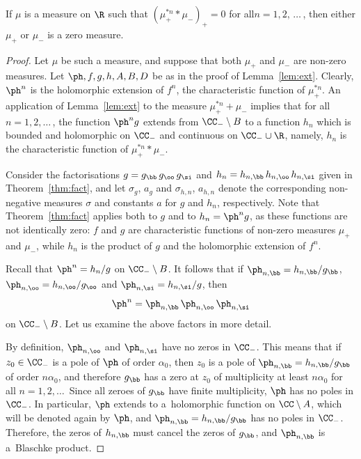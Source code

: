 \begin{lemm}\label{lem:wh}
If $\mu$ is a measure on $\R$ such that $(\mu_+^{*n} * \mu_-)_+ = 0$ for all\linebreak$n = 1, 2,\,\ldots\,$, then either $\mu_+$ or $\mu_-$ is a zero measure.
\end{lemm}

\begin{proof}
Let $\mu$ be such a measure, and suppose that both $\mu_+$ and $\mu_-$ are non-zero measures. Let $\ph, f, g, h, A, B, D$ be as in the proof of Lemma~\ref{lem:ext}. Clearly, $\ph^n$ is the holomorphic extension of $f^n$, the characteristic function of $\mu_+^{*n}$. An application of Lemma~\ref{lem:ext} to the measure $\mu_+^{*n} + \mu_-$ implies that for all $n = 1, 2, \ldots\,$, the function $\ph^n g$ extends from $\CC_- \setminus B$ to a function $h_n$ which is bounded and holomorphic on $\CC_-$ and continuous on $\CC_- \cup \R$, namely, $h_n$ is the characteristic function of $\mu_+^{*n} * \mu_-$.

Consider the factorisations $g = g_\bb\,g_\oo\,g_\si$ and $h_n = h_{n,\bb}\,h_{n,\oo}\, h_{n,\si}$ given in Theorem~\ref{thm:fact}, and let $\sigma_g$, $a_g$ and $\sigma_{h,n}$, $a_{h,n}$ denote the corresponding non-negative measures $\sigma$ and constants $a$ for $g$ and $h_n$, respectively. Note that Theorem~\ref{thm:fact} applies both to $g$ and to $h_n = \ph^n g$, as these functions are not identically zero: $f$ and $g$ are characteristic functions of non-zero measures $\mu_+$ and $\mu_-$, while $h_n$ is the product of $g$ and the holomorphic extension of $f^n$.

Recall that $\ph^n = h_n / g$ on $\CC_- \setminus B$. It follows that if $\ph_{n,\bb} = h_{n,\bb} / g_\bb$, $\ph_{n,\oo} = h_{n,\oo} / g_\oo$ and $\ph_{n,\si} = h_{n,\si} / g$, then
\[
\ph^n = \ph_{n,\bb}\,\ph_{n,\oo}\,\ph_{n,\si} \]
on $\CC_- \setminus B$. Let us examine the above factors in more detail.

By definition, $\ph_{n,\oo}$ and $\ph_{n,\si}$ have no zeros in $\CC_-$. This means that if $z_0 \in \CC_-$ is a pole of $\ph$ of order $\alpha_0$, then $z_0$ is a pole of $\ph_{n,\bb} = h_{n,\bb} / g_\bb$ of order $n \alpha_0$, and therefore $g_\bb$ has a zero at $z_0$ of multiplicity at least $n \alpha_0$ for all $n = 1, 2, \ldots$\, Since all zeroes of $g_\bb$ have finite multiplicity, $\ph$ has no poles in $\CC_-$. In particular, $\ph$ extends to a~holomorphic function on $\CC \setminus A$, which will be denoted again by $\ph$, and $\ph_{n,\bb} = h_{n,\bb} / g_\bb$ has no poles in $\CC_-$. Therefore, the zeros of $h_{n,\bb}$ must cancel the zeros of $g_\bb$, and $\ph_{n,\bb}$ is a~Blaschke product.


\end{proof}

